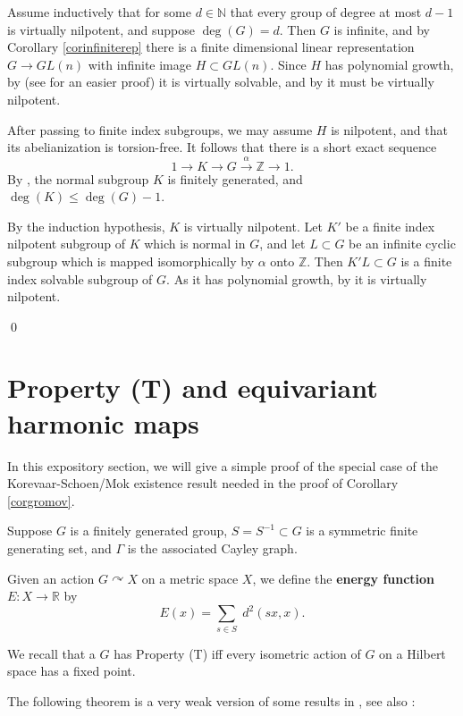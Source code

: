 \documentclass[12pt]{amsart}
\numberwithin{equation}{section}
\theoremstyle{plain}
\theoremstyle{remark}
\theoremstyle{definition}
\newcommand{\lra}{\longrightarrow}
\newcommand{\ra}{\rightarrow}
\newcommand{\N}{\mathbb N}
\newcommand{\R}{\mathbb R}
\newcommand{\Z}{\mathbb Z}
\newcommand{\acts}{\curvearrowright}
\newcommand{\al}{\alpha}
\def\Ga{\Gamma}
\def\lra{\longrightarrow}
\def\ra{\rightarrow}
\begin{document}
Assume inductively that for some $d\in \N$
that every group of degree at most $d-1$ is virtually
nilpotent, and suppose $\deg(G)=d$.   Then $G$ is infinite,  
and by Corollary \ref{corinfiniterep}  there is a finite 
dimensional
linear representation $G\ra GL(n)$ with infinite image $H\subset GL(n)$.
Since $H$ has polynomial growth, by \cite{tits} (see \cite{shalom}
for an easier proof) it is virtually solvable,
and by \cite{wolf,milnor} it must be virtually nilpotent.  

After passing to 
finite index subgroups, we may assume $H$ is nilpotent, and that its 
abelianization
is torsion-free.  It follows that there is a short exact sequence
$$
1\lra K\ra G\stackrel{\al}{\ra} \Z\lra 1.
$$
By \cite[Lemma (2.1)]{wilkie}, the normal subgroup $K$ is 
finitely generated,
and $\deg(K)\leq \deg(G)-1$.  

By the induction hypothesis, $K$ is virtually nilpotent. 
Let $K'$ be a 
finite index nilpotent subgroup of $K$ which is normal in $G$, 
and let
$L\subset G$ be an infinite cyclic subgroup which
is mapped  isomorphically by $\al$ onto $\Z$.  
Then $K'L\subset G$ 
is a finite
index solvable subgroup of $G$.  As it has polynomial growth, by 
\cite{wolf,milnor} it is virtually nilpotent.

\qed




\appendix

\section{Property (T) and equivariant harmonic maps}

In this expository section, we will give a simple proof of the 
special case of the Korevaar-Schoen/Mok existence result needed 
in the proof of Corollary \ref{corgromov}.



Suppose $G$ is a finitely generated group, $S=S^{-1}\subset G$
is a symmetric finite generating set, and $\Ga$
is the associated Cayley graph.

Given an  action $G\acts X$ on a metric space $X$, we
define the {\bf energy function} $E:X\ra \R$ by 
$$
E(x)=\sum_{s\in S}\;d^2(s x,x).
$$

We recall that a $G$ has Property (T) iff every isometric
action of $G$ on a Hilbert space has a fixed point.

The following theorem is a very weak version
of some results in  \cite{fishermargulis}, see also
\cite[pp.115-116]{randomgroups}:
\end{document}
